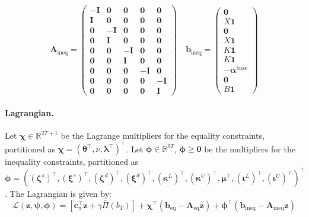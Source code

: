 \documentclass[12pt, notitlepage]{article}
\begin{document}
\[
\mathbf{A}_{\text{ineq}} =
\begin{pmatrix}
-\mathbf{I} & \mathbf{0} & \mathbf{0} & \mathbf{0} & \mathbf{0} \\ %
\mathbf{I} & \mathbf{0} & \mathbf{0} & \mathbf{0} & \mathbf{0} \\  %
\mathbf{0} & -\mathbf{I} & \mathbf{0} & \mathbf{0} & \mathbf{0} \\ %
\mathbf{0} & \mathbf{I} & \mathbf{0} & \mathbf{0} & \mathbf{0} \\  %
\mathbf{0} & \mathbf{0} & -\mathbf{I} & \mathbf{0} & \mathbf{0} \\ %
\mathbf{0} & \mathbf{0} & \mathbf{I} & \mathbf{0} & \mathbf{0} \\  %
\mathbf{0} & \mathbf{0} & \mathbf{0} & -\mathbf{I} & \mathbf{0} \\ %
\mathbf{0} & \mathbf{0} & \mathbf{0} & \mathbf{0} & -\mathbf{I} \\ %
\mathbf{0} & \mathbf{0} & \mathbf{0} & \mathbf{0} & \mathbf{I}     %
\end{pmatrix}
\quad
\mathbf{b}_{\text{ineq}} =
\begin{pmatrix}
\mathbf{0} \\
X \mathbf{1} \\
\mathbf{0} \\
X \mathbf{1} \\
K \mathbf{1} \\
K \mathbf{1} \\
-\boldsymbol{\alpha}^{\text{base}} \\
\mathbf{0} \\
B \mathbf{1}
\end{pmatrix}
\]

\paragraph{Lagrangian.}
Let $\boldsymbol{\chi} \in \mathbb{R}^{2T+1}$ be the Lagrange multipliers for the equality constraints, partitioned as $\boldsymbol{\chi} = (\boldsymbol{\theta}^\top, \nu, \boldsymbol{\lambda}^\top)^\top$. Let $\boldsymbol{\phi} \in \mathbb{R}^{9T}$, $\boldsymbol{\phi} \ge \mathbf{0}$ be the multipliers for the inequality constraints, partitioned as $\boldsymbol{\phi} = ((\boldsymbol{\zeta}^s)^\top, (\boldsymbol{\xi}^s)^\top, (\boldsymbol{\zeta}^d)^\top, (\boldsymbol{\xi}^d)^\top, (\boldsymbol{\kappa}^L)^\top, (\boldsymbol{\kappa}^U)^\top, \boldsymbol{\mu}^\top, (\boldsymbol{\iota}^L)^\top, (\boldsymbol{\iota}^U)^\top)^\top$. The Lagrangian is given by:
\[
\mathcal{L}(\mathbf{z}, \boldsymbol{\psi}, \boldsymbol{\phi}) = \left[ \mathbf{c}_{\pi}^\top \mathbf{z} + \gamma \bar{\Pi}(b_T) \right] + \boldsymbol{\chi}^\top (\mathbf{b}_{\text{eq}} - \mathbf{A}_{\text{eq}} \mathbf{z}) + \boldsymbol{\phi}^\top (\mathbf{b}_{\text{ineq}} - \mathbf{A}_{\text{ineq}} \mathbf{z})
\]
\end{document}

